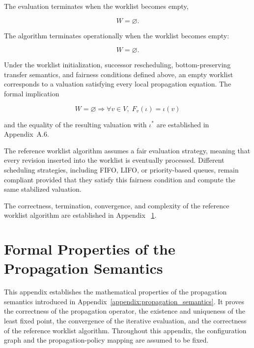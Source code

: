 \documentclass[10pt]{article}
\begin{document}
The evaluation terminates when the worklist becomes empty,

\begin{equation}
	\label{eq:worklist_stop}
	W
	=
	\varnothing.
\end{equation}

The algorithm terminates operationally when the worklist becomes empty:

\begin{equation}
	W
	=
	\varnothing.
	\label{eq:worklist_stop}
\end{equation}

Under the worklist initialization, successor rescheduling, bottom-preserving transfer semantics, and fairness conditions defined above, an empty worklist corresponds to a valuation satisfying every local propagation equation. The formal implication

\begin{equation}
	W
	=
	\varnothing
	\Longrightarrow
	\forall v\in V,\;
	F_v(\iota)
	=
	\iota(v)
	\label{eq:worklist_local_equilibrium}
\end{equation}

and the equality of the resulting valuation with $\iota^{*}$ are established in Appendix~A.6.

The reference worklist algorithm assumes a fair evaluation strategy, meaning that every revision inserted into the worklist is eventually processed.
Different scheduling strategies, including FIFO, LIFO, or priority-based queues, remain compliant provided that they satisfy this fairness condition and compute the same stabilized valuation.

The correctness, termination, convergence, and complexity of the reference worklist algorithm are established in Appendix ~\ref{appendix:formal_properties}.

\section{Formal Properties of the Propagation Semantics}
\label{appendix:formal_properties}

This appendix establishes the mathematical properties of the propagation semantics introduced in Appendix~\ref{appendix:propagation_semantics}. It proves the correctness of the propagation operator, the existence and
uniqueness of the least fixed point, the convergence of the iterative
evaluation, and the correctness of the reference worklist algorithm. Throughout this appendix, the configuration graph and the propagation-policy mapping are assumed to be fixed.
\end{document}
